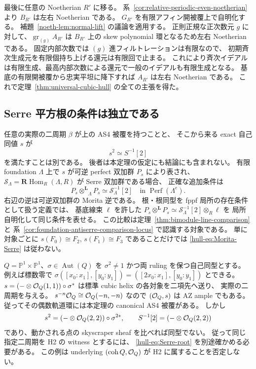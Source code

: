 最後に任意の Noetherian $R'$ に移る。
系~\ref{cor:relative-periodic-even-noetherian} より $B_{R'}$ は左右 Noetherian である。
$G_{R'}$ を有限アフィン開被覆上で自明化する。
補題~\ref{noeth-lem:normal-lift} の議論を適用する。
正則正規な正次数元 $g$ に対して、$\operatorname{gr}_{(g)}A_{R'}$ は
$B_{R'}$ 上の skew polynomial 環となるため左右 Noetherian である。
固定内部次数では $(g)$ 進フィルトレーションは有限なので、
初期斉次生成元を有限個持ち上げる還元は有限回で止まる。
これにより斉次イデアルは有限生成、最高内部次数による還元で一般のイデアルも有限生成となる。
基底の有限開被覆から忠実平坦に降下すれば $A_{R'}$ は左右 Noetherian である。
これで定理~\ref{thm:universal-cubic-hull} の全ての主張を得た。

\subsection{Serre 平方根の条件は独立である}

\begin{remark}
任意の実際の二周期 $\beta$ が上の AS4 被覆を持つことと、
そこから来る exact 自己同値 $s$ が
\[
 s^2\simeq S^{-1}[2]
 \tag{UH-20}\label{hull-eq:Serre-root}
\]
を満たすことは別である。
後者は本定理の仮定にも結論にも含まれない。
有限 foundation $\Lambda$ 上で $s$ が可逆 perfect 双加群 $P_s$ により表され、
$\mathcal S_\Lambda=\mathbf R\operatorname{Hom}_R(\Lambda,R)$ が Serre 双加群である場合、
正確な追加条件は
\[
 P_s\mathbin{\otimes^{\mathbf L}}_\Lambda P_s
    \simeq\mathcal S_\Lambda^{-1}[2]
 \quad\text{in }\operatorname{Perf}(\Lambda^e).
 \tag{UH-21}\label{hull-eq:Morita-Serre}
\]
右辺の逆は可逆双加群の Morita 逆である。
根・根同型を fppf 局所の存在条件として扱う定義では、
基底線束 $\ell$ を許した
$P_s\mathbin{\otimes^{\mathbf L}} P_s\simeq\mathcal S_\Lambda^{-1}[2]\otimes_R\ell$ を
局所自明化して同じ条件を表せる。
この比較は定理~\ref{thm:bimodule-line-comparison} と
系~\ref{cor:foundation-antiserre-comparison-locus} で認識する対象である。
単に対象ごとに $s(F_0)\cong F_2$, $s(F_1)\cong F_3$ であることだけでは
\eqref{hull-eq:Morita-Serre} は従わない。
\end{remark}

\begin{example}
$Q=\mathbb P^1\times\mathbb P^1$、$\sigma\in\operatorname{Aut}(Q)$ を
$\sigma^2\ne1$ かつ両 ruling を保つ自己同型とする。
例えば標数零で
$\sigma([x_0:x_1],[y_0:y_1])=([2x_0:x_1],[y_0:y_1])$ とできる。
$s=(-\otimes\mathcal O_Q(1,1))\circ\sigma^*$ は標準 cubic helix の各対象を二項先へ送り、
実際の二周期を与える。
$s^{-n}\mathcal O_Q\cong\mathcal O_Q(-n,-n)$ なので $(\mathcal O_Q,s)$ は AZ ample でもある。
従ってその偶数軌道環には本定理の canonical AS4 被覆がある。
しかし
\[
 s^2=(-\otimes\mathcal O_Q(2,2))\circ\sigma^{2*},\qquad
 S^{-1}[2]=(-\otimes\mathcal O_Q(2,2))
\]
であり、動かされる点の skyscraper sheaf を比べれば同型でない。
従って同じ指定二周期を H2 の witness とするには、
\eqref{hull-eq:Serre-root} を別途確かめる必要がある。
この例は underlying $(\operatorname{coh} Q,\mathcal O_Q)$ が H2 に属することを否定しない。
\end{example}

